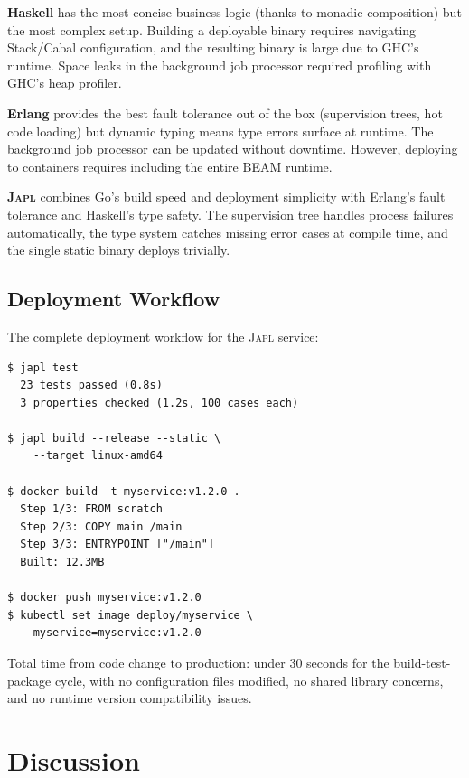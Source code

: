 \documentclass[11pt,twocolumn]{article}
\newcommand{\japl}{\textsc{Japl}}
\begin{document}
\textbf{Haskell} has the most concise business logic (thanks to monadic composition) but the most complex setup.
Building a deployable binary requires navigating Stack/Cabal configuration, and the resulting binary is large due to GHC's runtime.
Space leaks in the background job processor required profiling with GHC's heap profiler.

\textbf{Erlang} provides the best fault tolerance out of the box (supervision trees, hot code loading) but dynamic typing means type errors surface at runtime.
The background job processor can be updated without downtime.
However, deploying to containers requires including the entire BEAM runtime.

\textbf{\japl{}} combines Go's build speed and deployment simplicity with Erlang's fault tolerance and Haskell's type safety.
The supervision tree handles process failures automatically, the type system catches missing error cases at compile time, and the single static binary deploys trivially.

\subsection{Deployment Workflow}

The complete deployment workflow for the \japl{} service:

\begin{lstlisting}[language=shell]
$ japl test
  23 tests passed (0.8s)
  3 properties checked (1.2s, 100 cases each)

$ japl build --release --static \
    --target linux-amd64

$ docker build -t myservice:v1.2.0 .
  Step 1/3: FROM scratch
  Step 2/3: COPY main /main
  Step 3/3: ENTRYPOINT ["/main"]
  Built: 12.3MB

$ docker push myservice:v1.2.0
$ kubectl set image deploy/myservice \
    myservice=myservice:v1.2.0
\end{lstlisting}

Total time from code change to production: under 30 seconds for the build-test-package cycle, with no configuration files modified, no shared library concerns, and no runtime version compatibility issues.

\section{Discussion}
\label{sec:discussion}
\end{document}
